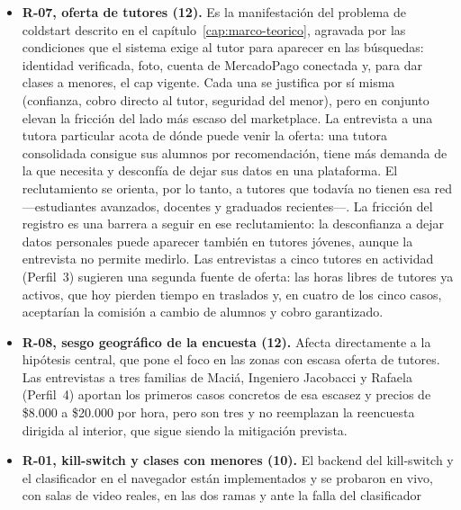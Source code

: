 \begin{itemize}
          observado en la plataforma; la puesta en marcha es la primera fuente de
          precios reales y el indicador que dispara la revisión.
    \item \textbf{R-07, oferta de tutores (12).} Es la manifestación del
          problema de \gls{coldstart} descrito en el
          capítulo~\ref{cap:marco-teorico}, agravada por las condiciones
          que el sistema exige al tutor para aparecer en las búsquedas:
          identidad verificada, foto, cuenta de MercadoPago conectada y,
          para dar clases a menores, el \gls{cap} vigente. Cada una se
          justifica por sí misma (confianza, cobro directo al tutor,
          seguridad del menor), pero en conjunto elevan la fricción del
          lado más escaso del \gls{marketplace}. La entrevista a una
          tutora particular acota de dónde puede venir la oferta: una
          tutora consolidada consigue sus alumnos por recomendación, tiene
          más demanda de la que necesita y desconfía de dejar sus datos en
          una plataforma. El reclutamiento se orienta, por lo tanto, a
          tutores que todavía no tienen esa red ---estudiantes avanzados,
          docentes y graduados recientes---. La fricción del registro es
          una barrera a seguir en ese reclutamiento: la desconfianza a
          dejar datos personales puede aparecer también en tutores
          jóvenes, aunque la entrevista no permite medirlo. Las entrevistas
          a cinco tutores en actividad (Perfil~3) sugieren una segunda
          fuente de oferta: las horas libres de tutores ya activos, que
          hoy pierden tiempo en traslados y, en cuatro de los cinco casos,
          aceptarían la comisión a cambio de alumnos y cobro garantizado.
    \item \textbf{R-08, sesgo geográfico de la encuesta (12).} Afecta
          directamente a la hipótesis central, que pone el foco en las
          zonas con escasa oferta de tutores. Las entrevistas a tres
          familias de Maciá, Ingeniero Jacobacci y Rafaela (Perfil~4)
          aportan los primeros casos concretos de esa escasez y precios de
          \$8.000 a \$20.000 por hora, pero son tres y no reemplazan la
          reencuesta dirigida al interior, que sigue siendo la mitigación
          prevista.
    \item \textbf{R-01, kill-switch y clases con menores (10).} El
          backend del kill-switch y el clasificador en el navegador están
          implementados y se probaron en vivo, con salas de video reales,
          en las dos ramas y ante la falla del clasificador

\end{itemize}
